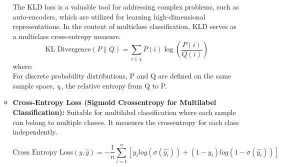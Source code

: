 \begin{itemize}
\begin{itemize}
        The KLD loss is a valuable tool for addressing complex problems, such as auto-encoders, which are utilized for learning high-dimensional representations. In the context of multiclass classification, KLD serves as a multiclass cross-entropy measure.
        \[
        \text{KL Divergence}(P \parallel Q) = \sum_{i \in \chi} P(i) \log\left(\frac{P(i)}{Q(i)}\right)
        \]
        where:\\
        For discrete probability distributions, P and Q are defined on the same sample space, $\chi$, the relative entropy from Q to P.
        \item \textbf{Cross-Entropy Loss (Sigmoid Crossentropy for Multilabel Classification): }
        Suitable for multilabel classification where each sample can belong to multiple classes. It measures the crossentropy for each class independently.

         \[
         \text{Cross Entropy Loss}(y,\hat{y})=-\frac{1}{n}\sum_{i=1}^{n}[y_{i}log(\sigma(\hat{y_{i}}))+(1-y_{i})log(1-\sigma(\hat{y_{i}}))]
         \]
      \end{itemize}

\end{itemize}

